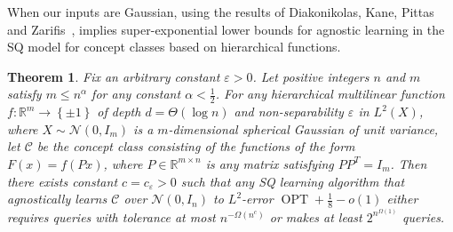 \documentclass[12pt,letterpaper]{amsart}
\def\R{\mathbb{R}}
\newcommand{\mc}[1]{\mathcal{#1}}
\newcommand{\set}[1]{\left\{#1\right\}}
\newcommand{\1}[1]{1_{\left\{#1\right\}}}
\newtheorem{theorem}{Theorem}[section]
\theoremstyle{definition}
\theoremstyle{remark}
\begin{document}
When our inputs are Gaussian, using the results of Diakonikolas, Kane, Pittas and Zarifis~\cite{diakonikolas2021optimality},  implies super-exponential lower bounds for agnostic learning in the SQ model for concept classes based on hierarchical functions.
\begin{theorem}\label{theorem:sq_learning_Gaussian}
    Fix an arbitrary constant $\varepsilon>0$.
    Let positive integers $n$ and $m$ satisfy $m\leq n^\alpha$ for any constant $\alpha<\frac{1}{2}$.
    For any hierarchical multilinear function $f:\R^m\to\set{\pm1}$ of depth $d=\Theta(\log n)$ and non-separability $\varepsilon$ in $L^2(X)$, where $X\sim\mc N(0,I_m)$ is a $m$-dimensional spherical Gaussian of unit variance, let $\mc C$ be the concept class consisting of the functions of the form $F(x)=f(Px)$, where $P\in\R^{m\times n}$ is any matrix satisfying $PP^T=I_m$.
    Then there exists constant $c=c_\varepsilon>0$ such that any SQ learning algorithm that agnostically learns $\mc C$ over $\mc N(0,I_n)$ to $L^2$-error $\operatorname{OPT}+\frac{1}{8}-o(1)$ either requires queries with tolerance at most $n^{-\Omega(n^c)}$ or makes at least $2^{n^{\Omega(1)}}$ queries.
\end{theorem}
\end{document}
